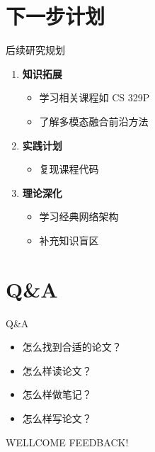 \documentclass[aspectratio=169,AutoFakeBold]{beamer}
\begin{document}

\section{下一步计划}
\begin{frame}{后续研究规划}
    \begin{enumerate}
        \item \textbf{知识拓展}
            \begin{itemize}
                \item 学习相关课程如 CS 329P
                \item 了解多模态融合前沿方法
            \end{itemize}
        \item \textbf{实践计划}
            \begin{itemize}
                \item 复现课程代码
            \end{itemize}
        \item \textbf{理论深化}
            \begin{itemize}
                \item 学习经典网络架构
                \item 补充知识盲区
            \end{itemize}
    \end{enumerate}
\end{frame}


\section{Q\&A}
\begin{frame}{Q\&A}
    \begin{itemize}
            \item 怎么找到合适的论文？
            \item 怎么样读论文？
            \item 怎么样做笔记？
            \item 怎么样写论文？
        \end{itemize} 
\end{frame}

\begin{frame}
    \Background
    \begin{center}
        {\Huge WELLCOME FEEDBACK!}
    \end{center}
\end{frame}
\end{document}
